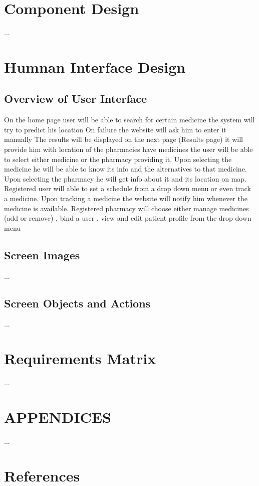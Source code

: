 \documentclass[]{article}
\begin{document}
\section{Component Design}
...


\section{Humnan Interface Design}

\subsection {Overview of User Interface}
On the home page user will be able to search for certain medicine the system will try to predict his location
\newline
On failure the website will ask him to enter it manually
\newline
The results will be displayed on the next page (Results page) it will provide him with location of the pharmacies have  medicines the user will be able to select either medicine or the pharmacy providing it.
\newline
Upon selecting the medicine he will be able to know its info and the alternatives to that medicine.
\newline
Upon selecting the pharmacy he will get info about it and its location on map.
\newline
\newline
Registered user will able to set a schedule from a drop down menu or even track a medicine.
\newline
Upon tracking a medicine the website will notify him whenever the medicine is available.
\newline
\newline
Registered pharmacy will choose either manage medicines (add or remove) , bind a user , view and edit patient profile from the drop down menu
\newline

\subsection {Screen Images}
...


\subsection {Screen Objects and Actions}
...


\section{Requirements Matrix}
...


\section{APPENDICES}
...

\section {References}



\end{document}
